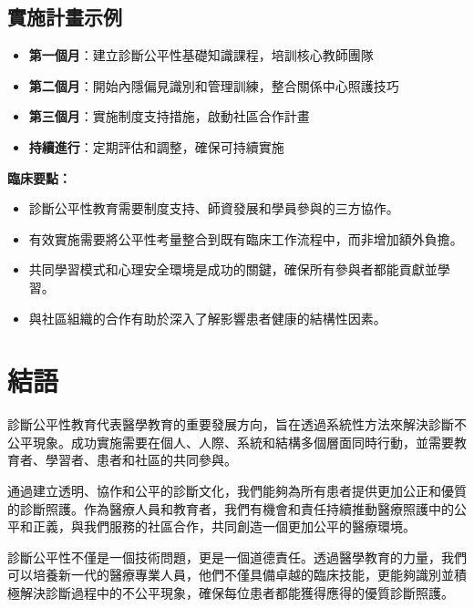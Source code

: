 \documentclass[12pt,a4paper]{article}
\begin{document}
\subsection{實施計畫示例}
\begin{itemize}[nosep]
    \item \textbf{第一個月}：建立診斷公平性基礎知識課程，培訓核心教師團隊
    \item \textbf{第二個月}：開始內隱偏見識別和管理訓練，整合關係中心照護技巧
    \item \textbf{第三個月}：實施制度支持措施，啟動社區合作計畫
    \item \textbf{持續進行}：定期評估和調整，確保可持續實施
\end{itemize}

\begin{importantbox}
\textbf{臨床要點：}
\begin{itemize}[nosep]
    \item 診斷公平性教育需要制度支持、師資發展和學員參與的三方協作。
    \item 有效實施需要將公平性考量整合到既有臨床工作流程中，而非增加額外負擔。
    \item 共同學習模式和心理安全環境是成功的關鍵，確保所有參與者都能貢獻並學習。
    \item 與社區組織的合作有助於深入了解影響患者健康的結構性因素。
\end{itemize}
\end{importantbox}

\section{結語}

診斷公平性教育代表醫學教育的重要發展方向，旨在透過系統性方法來解決診斷不公平現象。成功實施需要在個人、人際、系統和結構多個層面同時行動，並需要教育者、學習者、患者和社區的共同參與。

通過建立透明、協作和公平的診斷文化，我們能夠為所有患者提供更加公正和優質的診斷照護。作為醫療人員和教育者，我們有機會和責任持續推動醫療照護中的公平和正義，與我們服務的社區合作，共同創造一個更加公平的醫療環境。

診斷公平性不僅是一個技術問題，更是一個道德責任。透過醫學教育的力量，我們可以培養新一代的醫療專業人員，他們不僅具備卓越的臨床技能，更能夠識別並積極解決診斷過程中的不公平現象，確保每位患者都能獲得應得的優質診斷照護。
\end{document}
